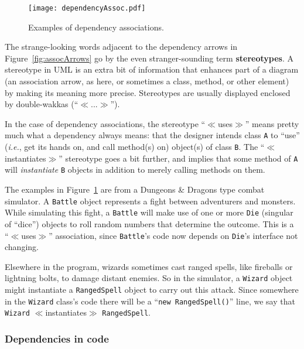 \begin{figure}[ht]
\centering
\texttt{[image: dependencyAssoc.pdf]}   %
\caption{Examples of dependency associations.}
\label{fig:dependencyExamples}
\end{figure}

\label{stereotype}
The strange-looking words adjacent to the dependency arrows in
Figure~\ref{fig:assocArrows} go by the even stranger-sounding term
\textbf{stereotypes}. A stereotype in UML is an extra bit of information that
enhances part of a diagram (an association arrow, as here, or sometimes a
class, method, or other element) by making its meaning more precise.
Stereotypes are usually displayed enclosed by double-wakkas
(``$\ll$...$\gg$'').

In the case of dependency associations, the stereotype ``$\ll$uses$\gg$'' means
pretty much what a dependency always means: that the designer intends class
\texttt{A} to ``use'' (\textit{i.e.}, get its hands on, and call method(s) on)
object(s) of class \texttt{B}. The ``$\ll$instantiates$\gg$'' stereotype goes a
bit further, and implies that some method of \texttt{A} will
\textit{instantiate} \texttt{B} objects in addition to merely calling methods
on them.

The examples in Figure~\ref{fig:dependencyExamples} are from a Dungeons \&
Dragons type combat simulator. A \texttt{Battle} object represents a fight
between adventurers and monsters. While simulating this fight, a
\texttt{Battle} will make use of one or more \texttt{Die} (singular of ``dice'')
objects to roll random numbers that determine the outcome. This is a
``$\ll$uses$\gg$'' association, since \texttt{Battle}'s code now depends on
\texttt{Die}'s interface not changing.

Elsewhere in the program, wizards sometimes cast ranged spells, like fireballs
or lightning bolts, to damage distant enemies. So in the simulator, a
\texttt{Wizard} object might instantiate a \texttt{RangedSpell}
object to carry out this attack. Since somewhere in the \texttt{Wizard} class's
code there will be a ``\texttt{new RangedSpell()}'' line, we say that
\texttt{Wizard} $\ll$instantiates$\gg$ \texttt{RangedSpell}.

\subsubsection{Dependencies in code}

